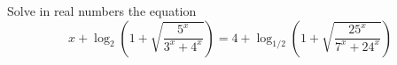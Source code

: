 Solve in real numbers the equation
\[ x+\log_{2}\left(  1+\sqrt{\frac{5^{x}}{3^{x}+4^{x}}}\right)  =4+\log_{1/2}\left(1+\sqrt{\frac{25^{x}}{7^{x}+24^{x}}}\right) \]